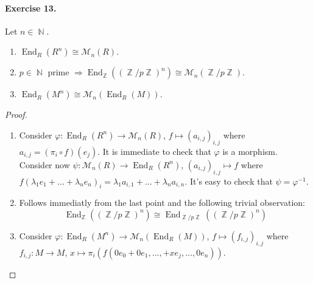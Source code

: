 \documentclass[12pt,a4paper]{report}
\theoremstyle{definition}
\theoremstyle{num.custom-title}
\DeclareMathOperator{\End}{End}
\DeclareMathOperator{\N}{\mathbb{N}}
\DeclareMathOperator{\Z}{\mathbb{Z}}
\DeclareMathOperator{\imp}{\Rightarrow}
\renewcommand{\phi}{\varphi}
\begin{document}
\paragraph{Exercise 13.} Let $n \in \N$.
\begin{enumerate}
\item $\End_R(R^n) \cong \mathcal M_n(R)$.
\item $p \in \N$ prime $\imp \End_{\Z}((\Z/p\Z)^n) \cong \mathcal M_n(\Z/p\Z)$.
\item $\End_R(M^n) \cong \mathcal M_n(\End_R(M))$.
\end{enumerate}
\begin{proof}\
\begin{enumerate}
\item Consider $\phi: \End_R(R^n) \to \mathcal M_n(R)$, $f \mapsto (a_{i,j})_{i,j}$ where $a_{i,j}=(\pi_i \circ f)(e_j)$. It is immediate to check that $\phi$ is a morphism. Consider now $\psi: \mathcal M_n(R) \to \End_R(R^n)$, $(a_{i,j})_{i,j} \mapsto f$ where $f(\lambda_1 e_1 + ... + \lambda_n e_n)_i=\lambda_1 a_{i,1} + ... + \lambda_n a_{i,n}$. It's easy to check that $\psi=\phi^{-1}$.
\item Follows immediatly from the last point and the following trivial observation:
\[
\End_{\Z}((\Z/p\Z)^n) \cong \End_{\Z/p\Z}((\Z/p\Z)^n)
\]
\item Consider $\phi: \End_R(M^n) \to \mathcal M_n(\End_R(M))$, $f \mapsto (f_{i,j})_{i,j}$ where $f_{i,j}: M \to M$, $x \mapsto \pi_i(f(0 e_0 + 0 e_1,...,+ x e_j,...,0 e_n))$.
\end{enumerate}
\end{proof}
\end{document}
